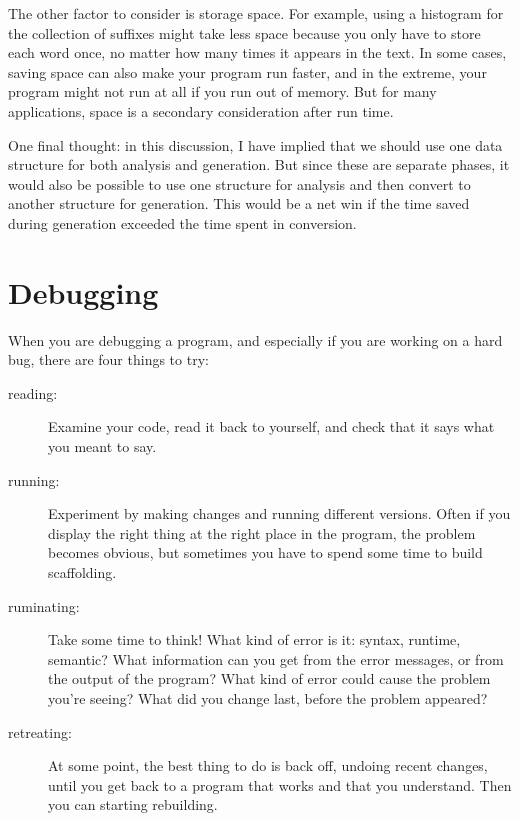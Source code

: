 \documentclass[10pt]{book}
\begin{document}
{

The other factor to consider is storage space.  For example, using a
histogram for the collection of suffixes might take less space because
you only have to store each word once, no matter how many times it
appears in the text.  In some cases, saving space can also make your
program run faster, and in the extreme, your program might not run at
all if you run out of memory.  But for many applications, space is a
secondary consideration after run time.

One final thought: in this discussion, I have implied that
we should use one data structure for both analysis and generation.  But
since these are separate phases, it would also be possible to use one
structure for analysis and then convert to another structure for
generation.  This would be a net win if the time saved during
generation exceeded the time spent in conversion.


\section{Debugging}

When you are debugging a program, and especially if you are
working on a hard bug, there are four things to try:

\begin{description}

\item[reading:] Examine your code, read it back to yourself, and
check that it says what you meant to say.

\item[running:] Experiment by making changes and running different
versions.  Often if you display the right thing at the right place
in the program, the problem becomes obvious, but sometimes you have to
spend some time to build scaffolding.

\item[ruminating:] Take some time to think!  What kind of error
is it: syntax, runtime, semantic?  What information can you get from
the error messages, or from the output of the program?  What kind of
error could cause the problem you're seeing?  What did you change
last, before the problem appeared?

\item[retreating:] At some point, the best thing to do is back
off, undoing recent changes, until you get back to a program that
works and that you understand.  Then you can starting rebuilding.


\end{description}}
\end{document}
